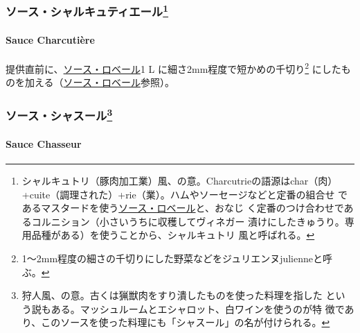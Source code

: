 \begin{recette}
\maeaki

\hypertarget{ux30bdux30fcux30b9ux30b7ux30e3ux30ebux30adux30e5ux30c6ux30a3ux30a8ux30fcux30eb8}{%
\subsubsection[ソース・シャルキュティエール]{\texorpdfstring{ソース・シャルキュティエール\footnote{シャルキュトリ（豚肉加工業）風、の意。Charcutrieの語源はchar（肉）
  +cuite（調理された）+rie（業）。ハムやソーセージなどと定番の組合せ
  であるマスタードを使う\protect\hyperlink{sauce-robert}{ソース・ロベール}と、おなじ
  く定番のつけ合わせであるコルニション（小さいうちに収穫してヴィネガー
  漬けにしたきゅうり。専用品種がある）を使うことから、シャルキュトリ
  風と呼ばれる。}}{ソース・シャルキュティエール}}\label{ux30bdux30fcux30b9ux30b7ux30e3ux30ebux30adux30e5ux30c6ux30a3ux30a8ux30fcux30eb8}}

\hypertarget{sauce-charcutiere}{%
\paragraph{Sauce Charcutière}\label{sauce-charcutiere}}

 

提供直前に、\href{}{ソース・ロベール}1 L
に細さ2mm程度で短かめの千切り\footnote{1〜2mm程度の細さの千切りにした野菜などをジュリエンヌjulienneと呼
  ぶ。} にしたものを加える（\href{}{ソース・ロベール}参照）。

\maeaki

\hypertarget{ux30bdux30fcux30b9ux30b7ux30e3ux30b9ux30fcux30eb10}{%
\subsubsection[ソース・シャスール]{\texorpdfstring{ソース・シャスール\footnote{狩人風、の意。古くは猟獣肉をすり潰したものを使った料理を指した
  という説もある。マッシュルームとエシャロット、白ワインを使うのが特
  徴であり、このソースを使った料理にも「シャスール」の名が付けられる。}}{ソース・シャスール}}\label{ux30bdux30fcux30b9ux30b7ux30e3ux30b9ux30fcux30eb10}}

\hypertarget{sauce-chasseur}{%
\paragraph{Sauce Chasseur}\label{sauce-chasseur}}


\end{recette}
